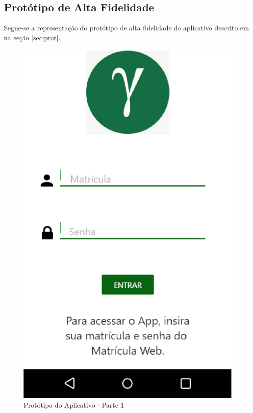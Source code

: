 \begin{anexosenv}

\partanexos

\chapter{Protótipo de Alta Fidelidade}
\label{protot}

Segue-se a representação do protótipo de alta fidelidade do aplicativo descrito em na seção \ref{sec:prot}.

\begin{figure}[!h]
  \centering
  \includegraphics[keepaspectratio=true,scale=0.6]{figuras/prot-0.eps}
  \caption{Protótipo do Aplicativo - Parte 1}
\end{figure}


\end{anexosenv}
